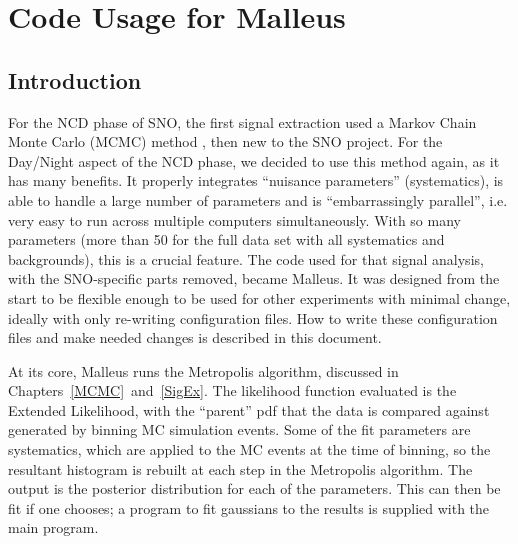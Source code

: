 
%



\chapter{Code Usage for Malleus}
\label{CodeUsage}

\section{Introduction}
For the NCD phase of SNO, the first signal extraction used a Markov
Chain Monte Carlo (MCMC) method \cite{BlairNCD}, then new to the SNO
project.  For the Day/Night aspect of the NCD phase, we decided to use
this method again, as it has many benefits.  It properly integrates
``nuisance parameters'' (systematics), is able to handle a large
number of parameters and is ``embarrassingly parallel'', i.e. very
easy to run across multiple computers simultaneously.  With so many
parameters (more than 50 for the full data set with all systematics
and backgrounds), this is a crucial feature.  The code used for that
signal analysis, with the SNO-specific parts removed, became Malleus.
It was designed from the start to be flexible enough to be used for
other experiments with minimal change, ideally with only re-writing
configuration files.  How to write these configuration files and make
needed changes is described in this document.

At its core, Malleus runs the Metropolis algorithm, discussed in
\mbox{Chapters \ref{MCMC} and \ref{SigEx}}.  The likelihood function
evaluated is the Extended Likelihood, with the ``parent'' pdf that the
data is compared against generated by binning MC simulation events.
Some of the fit parameters are systematics, which are applied to the
MC events at the time of binning, so the resultant histogram is
rebuilt at each step in the Metropolis algorithm.  The output is the
posterior distribution for each of the parameters.  This can then be
fit if one chooses; a program to fit gaussians to the results is
supplied with the main program.


